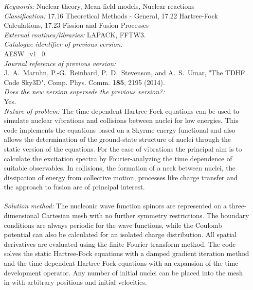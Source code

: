 \documentclass[final,1p,twocolumn]{elsarticle}
\begin{document}
\begin{small}
{\em Keywords:} Nuclear theory, Mean-field models, Nuclear reactions\\
{\em Classification:}  17.16 Theoretical Methods - General, 17.22 
Hartree-Fock Calculations, 17.23 Fission and Fusion Processes\\
{\em External routines/libraries:}  LAPACK, FFTW3. 
\\
{\em Catalogue identifier of previous version:}             \\
 AESW\_v1\_0.\\
{\em Journal reference of previous version:}                  \\
J.~A.~Maruhn, P.-G.~Reinhard, P.~D.~Stevenson, and A.~S.~Umar, "The
TDHF Code Sky3D", Comp. Phys. Comm. {\bf 185}, 2195 (2014).\\
{\em Does the new version supersede the previous version?:}   \\
Yes.\\

{\em Nature of problem:} The time-dependent Hartree-Fock equations can
be used to simulate nuclear vibrations and collisions between nuclei
for low energies. This code implements the equations based on a Skyrme
energy functional and also allows the determination of the
ground-state structure of nuclei through the static version of the
equations. For the case of vibrations the principal aim is to
calculate the excitation spectra by Fourier-analyzing the time
dependence of suitable observables. In collisions, the formation of a
neck between nuclei, the dissipation of energy from collective motion,
processes like charge transfer and the approach to fusion are of
principal interest.\\
\\
{\em Solution method:} The nucleonic wave function spinors are
represented on a three-dimensional Cartesian mesh with no further
symmetry restrictions. The boundary conditions are always periodic for
the wave functions, while the Coulomb potential can also be calculated
for an isolated charge distribution. All spatial derivatives are
evaluated using the finite Fourier transform method. The code solves
the static Hartree-Fock equations with a damped gradient iteration
method and the time-dependent Hartree-Fock equations with an expansion
of the time-development operator. Any number of initial nuclei can be
placed into the mesh in with arbitrary positions and
initial velocities.\\


\end{small}
\end{document}
